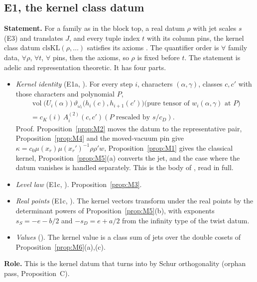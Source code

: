 \documentclass[11pt]{article}
\newcommand{\vol}{\operatorname{vol}}
\theoremstyle{remark}
\begin{document}
\subsection{E1, the kernel class datum}
\textbf{Statement.} For a family as in the block top, a real datum $\rho$ with jet scales $s$ (E3) and translates $J$, and every tuple index $t$ with its column pins, the kernel class datum $\mathrm{clsKL}(\rho,\ldots)$ satisfies its axioms . The quantifier order is $\forall$ family data, $\forall\rho$, $\forall t$, $\forall$ pins, then the axioms, so $\rho$ is fixed before $t$. The statement is adelic and representation theoretic. It has four parts.
\begin{itemize}[leftmargin=*,itemsep=1pt]
\item \emph{Kernel identity} (E1a, ). For every step $i$, characters $(\alpha,\gamma)$, classes $c,c'$ with those characters and polynomial $P$,
\begin{multline*}
\vol\bigl(U_i(\alpha)\bigr)\,\vartheta_{\omega_i}\bigl(h_i(c),h_{i+1}(c')\bigr)\bigl(\text{pure tensor of }w_i(\alpha,\gamma)\text{ at }P\bigr)\\
=c_K(i)\,A^{(2)}_i(c,c')(P\text{ rescaled by }s/c_D).
\end{multline*}
Proof. Proposition~\ref{prop:M2} moves the datum to the representative pair, Proposition~\ref{prop:M4} and the moved-vacuum pin give $\kappa=c_0\mu(x_r)\mu(x_r')^{-1}\rho\rho'w$, Proposition~\ref{prop:M1} gives the classical kernel, Proposition~\ref{prop:M5}(a) converts the jet, and the case where the datum vanishes is handled separately. This is the body of , read in full.
\item \emph{Level law} (E1c, ). Proposition~\ref{prop:M3}.
\item \emph{Real points} (E1c, ). The kernel vectors transform under the real points by the determinant powers of Proposition~\ref{prop:M5}(b), with exponents $s_S=-e-b/2$ and $-s_D=e+a/2$ from the infinity type of the twist datum.
\item \emph{Values} (). The kernel value is a class sum of jets over the double cosets of Proposition~\ref{prop:M6}(a),(c).
\end{itemize}
\textbf{Role.} This is the kernel datum that  turns into  by Schur orthogonality (orphan pass, Proposition~C).
\end{document}
